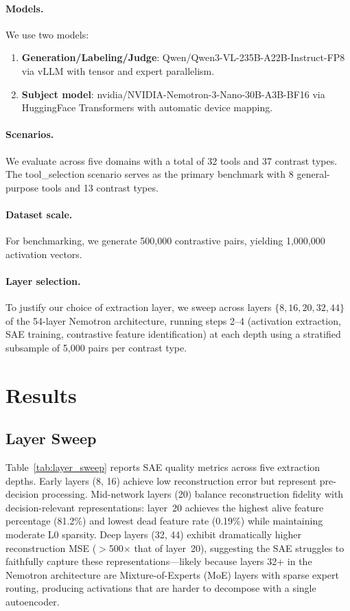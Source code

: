 \documentclass[runningheads]{llncs}
\begin{document}
\paragraph{Models.} We use two models:
\begin{enumerate}
\item \textbf{Generation/Labeling/Judge}: Qwen/Qwen3-VL-235B-A22B-Instruct-FP8 via vLLM with tensor and expert parallelism.
\item \textbf{Subject model}: nvidia/NVIDIA-Nemotron-3-Nano-30B-A3B-BF16 via HuggingFace Transformers with automatic device mapping.
\end{enumerate}

\paragraph{Scenarios.} We evaluate across five domains with a total of 32 tools and 37 contrast types. The tool\_selection scenario serves as the primary benchmark with 8 general-purpose tools and 13 contrast types.

\paragraph{Dataset scale.} For benchmarking, we generate 500,000 contrastive pairs, yielding 1,000,000 activation vectors.

\paragraph{Layer selection.} To justify our choice of extraction layer, we sweep across layers $\{8, 16, 20, 32, 44\}$ of the 54-layer Nemotron architecture, running steps 2--4 (activation extraction, SAE training, contrastive feature identification) at each depth using a stratified subsample of 5,000 pairs per contrast type.

\section{Results}
\label{sec:results}

\subsection{Layer Sweep}

Table~\ref{tab:layer_sweep} reports SAE quality metrics across five extraction depths. Early layers (8, 16) achieve low reconstruction error but represent pre-decision processing. Mid-network layers (20) balance reconstruction fidelity with decision-relevant representations: layer~20 achieves the highest alive feature percentage (81.2\%) and lowest dead feature rate (0.19\%) while maintaining moderate L0 sparsity. Deep layers (32, 44) exhibit dramatically higher reconstruction MSE ($>$500$\times$ that of layer~20), suggesting the SAE struggles to faithfully capture these representations---likely because layers 32+ in the Nemotron architecture are Mixture-of-Experts (MoE) layers with sparse expert routing, producing activations that are harder to decompose with a single autoencoder.
\end{document}
